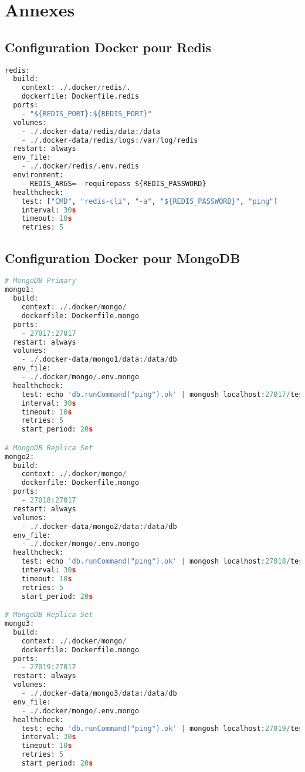\appendix
\chapter{Annexes}

\section{Configuration Docker pour Redis}
\label{ann:docker_redis}
\begin{lstlisting}[language=Python, caption=Fichier de configuration Docker pour Redis, label=lst:docker_redis]
redis:
  build:
    context: ./.docker/redis/.
    dockerfile: Dockerfile.redis
  ports:
    - "${REDIS_PORT}:${REDIS_PORT}"
  volumes:
    - ./.docker-data/redis/data:/data
    - ./.docker-data/redis/logs:/var/log/redis
  restart: always
  env_file:
    - ./.docker/redis/.env.redis
  environment:
    - REDIS_ARGS=--requirepass ${REDIS_PASSWORD}
  healthcheck:
    test: ["CMD", "redis-cli", "-a", "${REDIS_PASSWORD}", "ping"]
    interval: 30s
    timeout: 10s
    retries: 5
\end{lstlisting}
\section{Configuration Docker pour MongoDB}
\label{ann:docker_mongo}
\begin{lstlisting}[language=Python, caption=Fichier de configuration Docker pour MongoDB, label=lst:docker_mongo]
# MongoDB Primary
mongo1:
  build:
    context: ./.docker/mongo/
    dockerfile: Dockerfile.mongo
  ports:
    - 27017:27017
  restart: always
  volumes:
    - ./.docker-data/mongo1/data:/data/db
  env_file:
    - ./.docker/mongo/.env.mongo
  healthcheck:
    test: echo 'db.runCommand("ping").ok' | mongosh localhost:27017/test --quiet
    interval: 30s
    timeout: 10s
    retries: 5
    start_period: 20s

# MongoDB Replica Set
mongo2:
  build:
    context: ./.docker/mongo/
    dockerfile: Dockerfile.mongo
  ports:
    - 27018:27017
  restart: always
  volumes:
    - ./.docker-data/mongo2/data:/data/db
  env_file:
    - ./.docker/mongo/.env.mongo
  healthcheck:
    test: echo 'db.runCommand("ping").ok' | mongosh localhost:27018/test --quiet
    interval: 30s
    timeout: 10s
    retries: 5
    start_period: 20s

# MongoDB Replica Set
mongo3:
  build:
    context: ./.docker/mongo/
    dockerfile: Dockerfile.mongo
  ports:
    - 27019:27017
  restart: always
  volumes:
    - ./.docker-data/mongo3/data:/data/db
  env_file:
    - ./.docker/mongo/.env.mongo
  healthcheck:
    test: echo 'db.runCommand("ping").ok' | mongosh localhost:27019/test --quiet
    interval: 30s
    timeout: 10s
    retries: 5
    start_period: 20s
\end{lstlisting}

